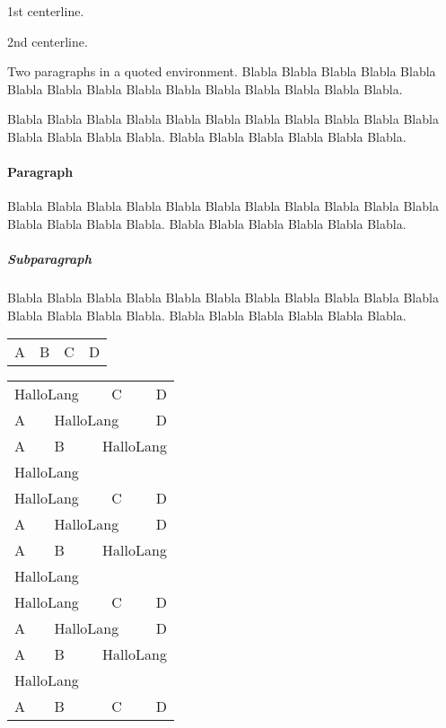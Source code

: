 \centerline{1st centerline.}
\centerline{2nd centerline.}

\begin{center}
  Two paragraphs in a quoted environment. Blabla Blabla Blabla Blabla
  Blabla Blabla Blabla Blabla Blabla Blabla Blabla Blabla Blabla
  Blabla Blabla.
  
  Blabla Blabla Blabla Blabla Blabla Blabla Blabla Blabla Blabla
  Blabla Blabla Blabla Blabla Blabla Blabla.  Blabla Blabla Blabla
  Blabla Blabla Blabla.
\end{center}

\paragraph{Paragraph}

  Blabla Blabla Blabla Blabla Blabla Blabla Blabla Blabla Blabla
  Blabla Blabla Blabla Blabla Blabla Blabla.  Blabla Blabla Blabla
  Blabla Blabla Blabla.

\subparagraph{Subparagraph}

  Blabla Blabla Blabla Blabla Blabla Blabla Blabla Blabla Blabla
  Blabla Blabla Blabla Blabla Blabla Blabla.  Blabla Blabla Blabla
  Blabla Blabla Blabla.

\begin{tabular}{llcr}
A & B & C & D
\end{tabular}

\begin{tabular}{llcr}\hline
\multicolumn{2}{l}{HalloLang} & C & D     \\
A & \multicolumn{2}{l}{HalloLang} & D     \\
A & B & \multicolumn{2}{l}{HalloLang}     \\
\multicolumn{4}{l}{HalloLang}             \\
%
\multicolumn{2}{l}{HalloLang} & C & D     \\\hline
A & \multicolumn{2}{l}{HalloLang} & D     \\\hline
A & B & \multicolumn{2}{l}{HalloLang}     \\\hline
\multicolumn{4}{l}{HalloLang}             \\\hline
%
\multicolumn{2}{l}{HalloLang} & C & D     \\\hline\hline
A & \multicolumn{2}{l}{HalloLang} & D     \\\hline\hline
A & B & \multicolumn{2}{l}{HalloLang}     \\\hline\hline
\multicolumn{4}{l}{HalloLang}             \\\hline\hline
%
A & B & C & D                             \\\hline\hline
\end{tabular}

